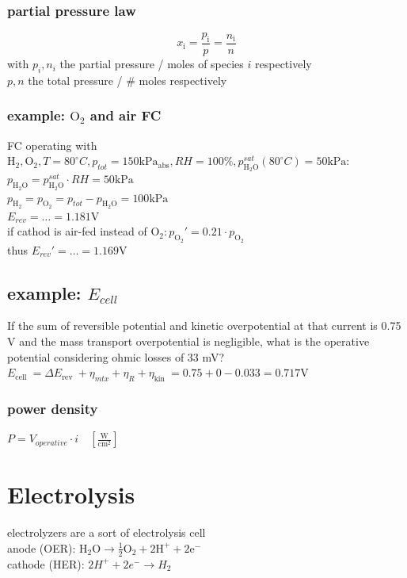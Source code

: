 \documentclass[a4paper,10pt,landscape]{scrartcl}
\begin{document}
\begin{multicols*}{3}
\subsubsection{partial pressure law}
$$
x_{\mathrm{i}}=\frac{p_{\mathrm{i}}}{p}=\frac{n_{\mathrm{i}}}{n}
$$
with $p_i,  n_i$ the partial pressure / moles of species $i$ respectively \\
$p,n$ the total pressure / \# moles respectively

\subsubsection{example: $\mathrm{O_2}$ and air FC}
FC operating with $\mathrm{H_2,O_2},T=80^\circ C, p_{tot}=150\mathrm{kPa_{abs}}, RH=100\%, p^{sat}_\mathrm{H_2O}(80^\circ C)=50\mathrm{kPa}$: \\
$p_\mathrm{H_2O} = p^{sat}_\mathrm{H_2O}\cdot RH=50\mathrm{kPa}$ \\
$p_\mathrm{H_2}=p_\mathrm{O_2}=p_{tot}-p_\mathrm{H_2O}=100 \mathrm{kPa}$ \\
$E_{rev}=\dots=1.181 \mathrm{V}$ \\
if cathod is air-fed instead of $\mathrm{O_2}: p_\mathrm{O_2}'=0.21\cdot p_\mathrm{O_2}$ \\
thus $E_{rev}'=\dots=1.169 \mathrm{V}$

\subsection{example: $E_{cell}$}
If the sum of reversible potential and kinetic overpotential at that current is 0.75 V and the mass transport overpotential is negligible, what is the operative potential considering ohmic losses of $33$ mV? \\
$E_{\text {cell }} =\Delta E_{\text {rev }}+\eta_{mtx}+\eta_R+\eta_{\text {kin }}=0.75 + 0 - 0.033=0.717 \mathrm{V}$

\subsubsection{power density}
$P=V_{operative}\cdot i \quad\left[\mathrm{\frac{W}{cm^2}}\right]$


\section{Electrolysis}
electrolyzers are a sort of electrolysis cell \\
anode (OER): $\mathrm{H_2O\rightarrow \frac{1}{2}O_2+2H^+ + 2e^-}$ \\
cathode (HER): $2H^+ + 2e^- \rightarrow H_2$

\end{multicols*}
\end{document}
